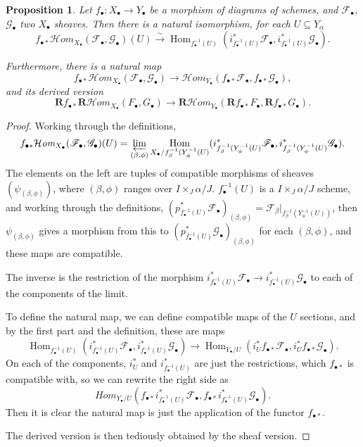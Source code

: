 \documentclass{report}
\newtheorem{prop}[theorem]{Proposition}
\theoremstyle{definition}
\DeclareMathOperator{\Hom}{Hom}
\newcommand{\cHom}{\mathcal{H} \textit{om}}
\newcommand{\FF}{\mathscr{F}}
\newcommand{\GG}{\mathscr{G}}
\newcommand{\bR}{\textbf{R}}
\begin{document}
\begin{prop}
	\label{thm:chomnatmap}
	Let $f_\bullet : X_\bullet \rightarrow Y_\bullet$ be a morphism of diagrams of schemes, and $\FF_\bullet$, $\GG_\bullet$ two $X_\bullet$ sheaves.
	Then there is a natural isomorphism, for each $U \subseteq Y_\alpha$
	\[
	f_{\bullet *}  \cHom_{X_\bullet} (\FF_\bullet, \GG_\bullet) (U) \xrightarrow{\sim} \Hom_{f_\bullet^{-1}(U)} ( i_{f_\bullet^{-1}(U)}^* \FF_\bullet, i_{f_\bullet^{-1}(U)}^* \GG_\bullet).
	\]
	
	Furthermore, there is a natural map
	\[
	f_{\bullet *} \cHom_{X_\bullet} (\FF_\bullet , \GG_\bullet) \rightarrow \cHom_{Y_\bullet} (f_{\bullet *} \FF_\bullet, f_{\bullet *} \GG_\bullet),
	\]
	and its derived version
	\[
	\bR f_{\bullet *} \bR \cHom_{X_\bullet} (F_\bullet , G_\bullet) \rightarrow \bR \cHom_{Y_\bullet} (\bR f_{\bullet *} F_\bullet, \bR f_{\bullet *} G_\bullet).
	\]
\end{prop}
\begin{proof}
	Working through the definitions,
	\[
	f_{\bullet *}  \cHom_{X_\bullet} (\FF_\bullet, \GG_\bullet) (U) = \varprojlim_{(\beta, \phi)} \Hom_{X_\bullet / f_\beta^{-1}(Y_\phi^{-1}(U)} (i_{f_\beta^{-1}(Y_\phi^{-1}(U)}^* \FF_\bullet, i_{f_\beta^{-1}(Y_\phi^{-1}(U)}^* \GG_\bullet).
	\]
	The elements on the left are tuples of compatible morphisms of sheaves $(\psi_{(\beta, \phi)})$, where $(\beta, \phi)$ ranges over $I \times_J \alpha/J$.
	$f_\bullet^{-1}(U)$ is a $I \times_J \alpha/J$ scheme, and working through the definitions, $(p_{f_\bullet^{-1}(U)}^* \FF_\bullet)_{(\beta, \phi)} = \FF_\beta |_{f^{-1}_\beta(Y_\phi^{-1}(U))}$, then $\psi_{(\beta, \phi)}$ gives a morphism from this to $(p_{f_\bullet^{-1}(U)}^* \GG_\bullet)_{(\beta, \phi)}$ for each $(\beta, \phi)$, and these maps are compatible.
	
	The inverse is the restriction of the morphism $i_{f_\bullet^{-1}(U)}^* \FF_\bullet \rightarrow i_{f_\bullet^{-1}(U)}^* \GG_\bullet$ to each of the components of the limit.
	
	To define the natural map, we can define compatible maps of the $U$ sections, and by the first part and the definition, these are maps
	\[
	\Hom_{f_\bullet^{-1}(U)} ( i_{f_\bullet^{-1}(U)}^* \FF_\bullet, i_{f_\bullet^{-1}(U)}^* \GG_\bullet) \rightarrow \Hom_{Y_\bullet / U} (i_U^* f_{\bullet *} \FF_\bullet, i_U^* f_{\bullet *} \GG_\bullet).
	\] 
	On each of the components, $i_U^*$ and $i_{f_\bullet^{-1}(U)}^*$ are just the restrictions, which $f_{\bullet *}$ is compatible with, so we can rewrite the right side as
	\[
	Hom_{Y_\bullet / U} (f_{\bullet *} i_{f_\bullet^{-1}(U)}^*\FF_\bullet,  f_{\bullet *} i_{f_\bullet^{-1}(U)}^*\GG_\bullet).
	\]
	Then it is clear the natural map is just the application of the functor $f_{\bullet *}$.
	
	The derived version is then tediously obtained by the sheaf version.
\end{proof}
\end{document}
